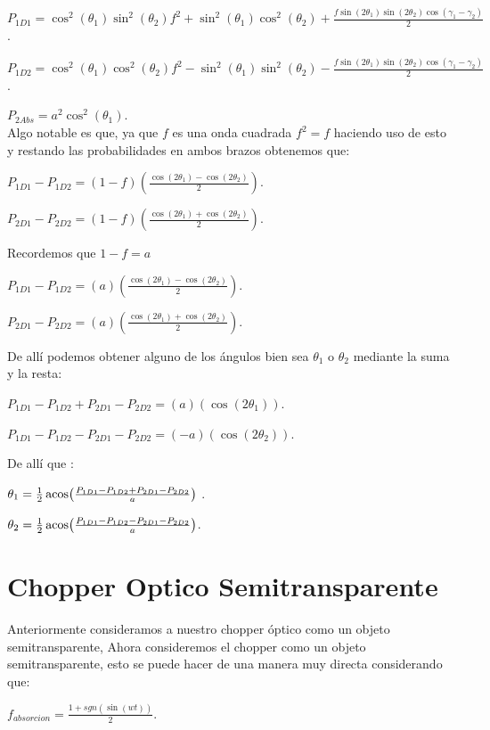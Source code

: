 \documentclass[11pt]{article}
\begin{document}
\vspace{15cm}

$P_{1D1}=\cos^2(\theta_{1})\sin^2(\theta_{2})f^2+ \sin^2(\theta_{1})\cos^2(\theta_{2})+\frac{f \sin(2\theta_{1})\sin(2\theta_{2})\cos(\gamma_{1}-\gamma_{2})}{2}$.

$P_{1D2}=\cos^2(\theta_{1})\cos^2(\theta_{2})f^2- \sin^2(\theta_{1})\sin^2(\theta_{2})-\frac{f \sin(2\theta_{1})\sin(2\theta_{2})\cos(\gamma_{1}-\gamma_{2})}{2}$.

$P_{2Abs}=a^2 \cos^2(\theta_{1})$.\\


Algo notable es que, ya que $f$ es una onda cuadrada $f^2=f$ haciendo uso de esto y restando las probabilidades en ambos brazos obtenemos que:

$P_{1D1}-P_{1D2}=(1-f)\left(\frac{\cos(2 \theta_{1})-\cos(2 \theta_{2})}{2}\right)$.

$P_{2D1}-P_{2D2}=(1-f)\left(\frac{\cos(2 \theta_{1})+\cos(2 \theta_{2})}{2}\right)$.

Recordemos que $1-f=a$

$P_{1D1}-P_{1D2}=(a)\left(\frac{\cos(2 \theta_{1})-\cos(2 \theta_{2})}{2}\right)$.

$P_{2D1}-P_{2D2}=(a)\left(\frac{\cos(2 \theta_{1})+\cos(2 \theta_{2})}{2}\right)$.

 De allí podemos obtener alguno de los ángulos bien sea $\theta_{1}$ o $\theta_
{2}$ mediante la suma y la resta:

$P_
{1D1}-P_
{1D2}+P_
{2D1}-P_
{2D2}=(a)(\cos
(2 \theta_
{1}))$.

$P_
{1D1}-P_
{1D2}-P_
{2D1}-P_
{2D2}=(-a
)(\cos
(2 \theta_
{2}))$.

De allí que :

 
$ \theta_
{1}=\frac{1}{2}\acos(\frac{P_
{1D1}-P_
{1D2}+P_
{2D1}-P_
{2D2}}{a})$ .

$\theta_
{2}=\frac{1}{2}\acos(\frac{P_
{1D1}-P_
{1D2}-P_
{2D1}-P_
{2D2}}{a})$.

\section{Chopper Optico Semitransparente}

Anteriormente consideramos a nuestro chopper
 óptico como un objeto semitransparente, Ahora consideremos el chopper
 como un objeto semitransparente, esto se puede hacer de una manera muy directa considerando que:
 
 $f_{absorcion}=\frac{1+sgn(\sin(wt))}{2}$.
\end{document}
